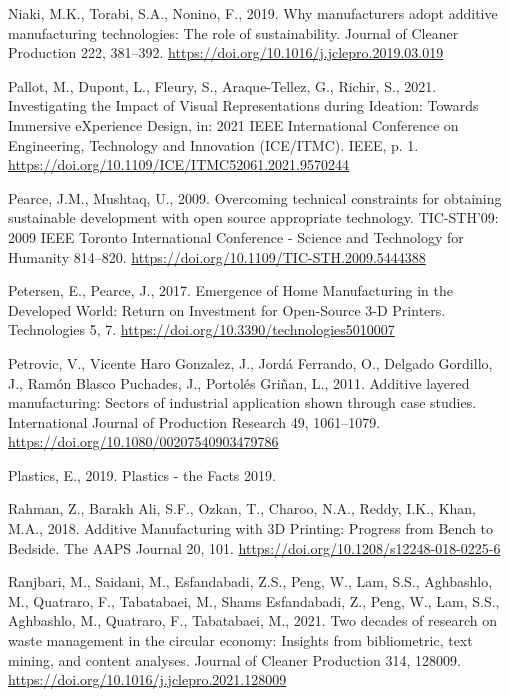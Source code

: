 \documentclass[
  11pt,
]{article}
\newlength{\cslhangindent}
\newlength{\cslentryspacingunit} %
\newenvironment{CSLReferences}[2] %
 {%
  \setlength{\parindent}{0pt}
  \ifodd #1
  \let\oldpar\par
  \def\par{\hangindent=\cslhangindent\oldpar}
  \fi
  \setlength{\parskip}{#2\cslentryspacingunit}
 }%
 {}
\begin{document}
\begin{CSLReferences}{1}{0}
\leavevmode{}%
Niaki, M.K., Torabi, S.A., Nonino, F., 2019. Why manufacturers adopt
additive manufacturing technologies: {The} role of sustainability.
Journal of Cleaner Production 222, 381--392.
\url{https://doi.org/10.1016/j.jclepro.2019.03.019}

\leavevmode{}%
Pallot, M., Dupont, L., Fleury, S., Araque-Tellez, G., Richir, S., 2021.
Investigating the {Impact} of {Visual Representations} during
{Ideation}: {Towards Immersive eXperience Design}, in: 2021 {IEEE
International Conference} on {Engineering}, {Technology} and
{Innovation} ({ICE}/{ITMC}). {IEEE}, p. 1.
\url{https://doi.org/10.1109/ICE/ITMC52061.2021.9570244}

\leavevmode{}%
Pearce, J.M., Mushtaq, U., 2009. Overcoming technical constraints for
obtaining sustainable development with open source appropriate
technology. TIC-STH'09: 2009 IEEE Toronto International Conference -
Science and Technology for Humanity 814--820.
\url{https://doi.org/10.1109/TIC-STH.2009.5444388}

\leavevmode{}%
Petersen, E., Pearce, J., 2017. Emergence of {Home Manufacturing} in the
{Developed World}: {Return} on {Investment} for {Open-Source} 3-{D
Printers}. Technologies 5, 7.
\url{https://doi.org/10.3390/technologies5010007}

\leavevmode{}%
Petrovic, V., Vicente Haro Gonzalez, J., Jordá Ferrando, O., Delgado
Gordillo, J., Ramón Blasco Puchades, J., Portolés Griñan, L., 2011.
Additive layered manufacturing: Sectors of industrial application shown
through case studies. International Journal of Production Research 49,
1061--1079. \url{https://doi.org/10.1080/00207540903479786}

\leavevmode{}%
Plastics, E., 2019. Plastics - the {Facts} 2019.

\leavevmode{}%
Rahman, Z., Barakh Ali, S.F., Ozkan, T., Charoo, N.A., Reddy, I.K.,
Khan, M.A., 2018. Additive {Manufacturing} with {3D Printing}:
{Progress} from {Bench} to {Bedside}. The AAPS Journal 20, 101.
\url{https://doi.org/10.1208/s12248-018-0225-6}

\leavevmode{}%
Ranjbari, M., Saidani, M., Esfandabadi, Z.S., Peng, W., Lam, S.S.,
Aghbashlo, M., Quatraro, F., Tabatabaei, M., Shams Esfandabadi, Z.,
Peng, W., Lam, S.S., Aghbashlo, M., Quatraro, F., Tabatabaei, M., 2021.
Two decades of research on waste management in the circular economy:
{Insights} from bibliometric, text mining, and content analyses. Journal
of Cleaner Production 314, 128009.
\url{https://doi.org/10.1016/j.jclepro.2021.128009}


\end{CSLReferences}
\end{document}
